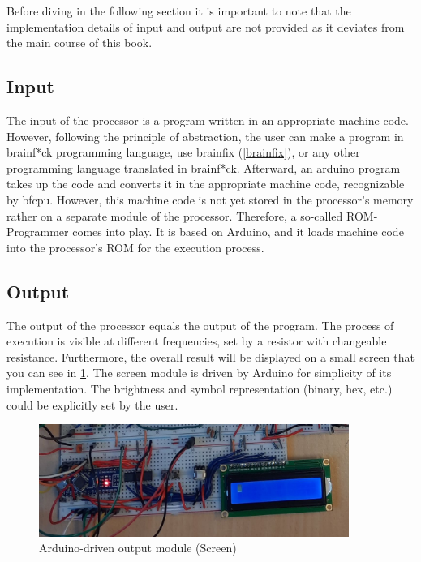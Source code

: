 Before diving in the following section it is important to note that the implementation details of input and output are not provided as it deviates from the main course of this book. 

\subsection{Input} \label{sec:implementation:input}
The input of the processor is a program written in an appropriate machine code. However, following the principle of abstraction, the user can make a program in brainf*ck programming language, use brainfix (\ref{brainfix}), or any other programming language translated in brainf*ck. Afterward, an arduino program takes up the code and converts it in the appropriate machine code, recognizable by bfcpu. However, this machine code is not yet stored in the processor's memory rather on a separate module of the processor. Therefore, a so-called ROM-Programmer comes into play. It is based on Arduino, and it loads machine code into the processor's ROM for the execution process.

\subsection{Output} \label{sec:implementation:output}
The output of the processor equals the output of the program. The process of execution is visible at different frequencies, set by a resistor with changeable resistance. Furthermore, the overall result will be displayed on a small screen that you can see in \ref{fig:output:screen_module}. The screen module is driven by Arduino for simplicity of its implementation. The brightness and symbol representation (binary, hex, etc.) could be explicitly set by the user.

\begin{figure}[H]
	\centering
	\includegraphics[width=0.9\textwidth]{img/screen}
	\caption{Arduino-driven output module (Screen)}
	\label{fig:output:screen_module}
\end{figure}
